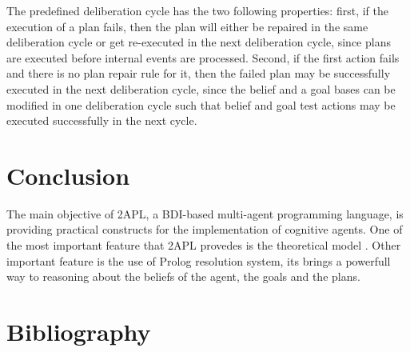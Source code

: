 \documentclass[a4paper]{article}
\begin{document}
The predefined deliberation cycle has the two following properties: first, if the execution of a plan fails, then the plan will either be repaired in the same deliberation cycle or get re-executed in the next deliberation cycle, since plans are executed before internal events are processed. Second, if the first action fails and there is no plan repair rule for it, then the failed plan may be successfully executed in the next deliberation cycle, since the belief and a goal bases can be modified in one deliberation cycle such that belief and goal test actions may be executed successfully in the next cycle.


\section{Conclusion} %

The main objective of 2APL, a BDI-based multi-agent programming language, is providing practical constructs for the implementation of cognitive agents. One of the most important feature that 2APL provedes is the theoretical model . Other important feature is the use of Prolog resolution system, its brings a powerfull way to reasoning about the beliefs of the agent, the goals and the plans.


\section{Bibliography}
\nocite{*}


\end{document}
